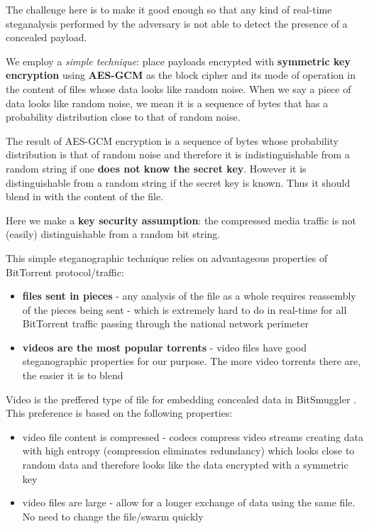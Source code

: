 \documentclass[11pt]{article} %
\newcommand{\projectName}{BitSmuggler }
\begin{document}
The challenge here is to make it good enough so that any kind of real-time steganalysis performed by the adversary is not able to detect the presence of a concealed payload.

We employ a \textit{simple technique}: place payloads encrypted with \textbf{symmetric key encryption} using \textbf{AES-GCM} as the block cipher and its mode of operation in the content of files whose data looks like random noise. When we say a piece of data looks like random noise, we mean it is a sequence of bytes that has a probability distribution close to that of random noise.

The result of AES-GCM encryption is a sequence of bytes whose probability distribution is that of random noise and therefore it is indistinguishable from a random string if one \textbf{does not know the secret key}. However it is distinguishable from a random string if the secret key is known. Thus it should blend in with the content of the file.

Here we make a \textbf{key security assumption}: the compressed media traffic is not (easily) distinguishable from a random bit string. 

This simple steganographic technique relies on advantageous properties of BitTorrent protocol/traffic:
\begin{itemize}
\item \textbf{files sent in pieces} - any analysis of the file as a whole requires reassembly of the pieces being sent - which is extremely hard to do in real-time for all BitTorrent traffic passing through the national network perimeter
\item \textbf{videos are the most popular torrents} - video files have good steganographic properties for our purpose. The more video torrents there are, the easier it is to blend
\end{itemize}


Video is the preffered type of file for embedding concealed data in \projectName. This preference is based on the following properties:
\begin{itemize}
\item video file content is compressed - codecs compress video streams creating data with high entropy (compression eliminates redundancy) which looks close to random data and therefore looks like the data encrypted with a symmetric key
\item video files are large - allow for a longer exchange of data using the same file. No need to change the file/swarm quickly

\end{itemize}
\end{document}
